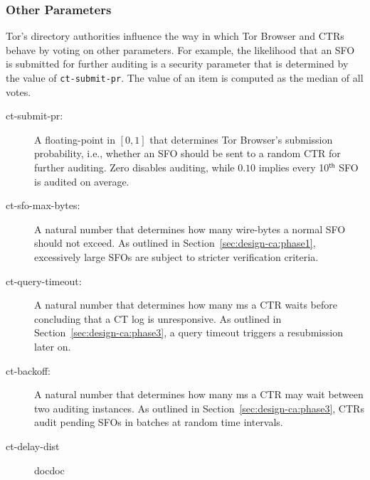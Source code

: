 \subsubsection{Other Parameters} \label{sec:design-ca:consensus:params}
Tor's directory authorities influence the way in which Tor Browser and CTRs
behave by voting on other parameters.  For example, the likelihood that
an SFO is submitted for further auditing is a security parameter that is
determined by the value of \texttt{ct-submit-pr}.  The value of an item is
computed as the median of all votes.
\begin{description}
	\item[ct-submit-pr:] A floating-point in $[0,1]$ that determines Tor
		Browser's submission probability, i.e., whether an SFO should be sent to
		a random CTR for further auditing.  Zero disables auditing,
		while $0.10$ implies every 10$^{\mathsf{th}}$ SFO is audited
		on average.
	\item[ct-sfo-max-bytes:] A natural number that determines how many
		wire-bytes a normal SFO should not exceed.  As outlined in
		Section~\ref{sec:design-ca:phase1}, excessively large SFOs are subject
		to stricter verification criteria.
	\item[ct-query-timeout:] A natural number that determines how many ms a CTR
		waits before concluding that a CT log is unresponsive.  As outlined in
		Section~\ref{sec:design-ca:phase3}, a query timeout triggers a
		resubmission later on.
	\item[ct-backoff:] A natural number that determines how many ms a CTR
		may wait between two auditing instances.  As outlined in
		Section~\ref{sec:design-ca:phase3}, CTRs audit pending SFOs
		in batches at random time intervals.
	\item[ct-delay-dist] docdoc
\end{description}


